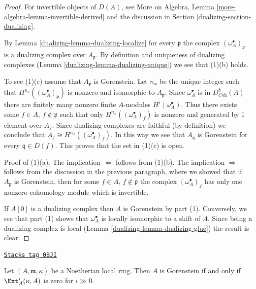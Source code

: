 \begin{proof}

For invertible objects of $D(A)$, see
More on Algebra, Lemma \ref{more-algebra-lemma-invertible-derived}
and the discussion in Section \ref{dualizing-section-dualizing}.

\medskip\noindent
By Lemma \ref{dualizing-lemma-dualizing-localize} for every
$\mathfrak p$ the complex $(\omega_A^\bullet)_\mathfrak p$ is a
dualizing complex over $A_\mathfrak p$. By definition and uniqueness
of dualizing complexes (Lemma \ref{dualizing-lemma-dualizing-unique})
we see that (1)(b) holds.

\medskip\noindent
To see (1)(c) assume that $A_\mathfrak p$ is Gorenstein.
Let $n_x$ be the unique integer such that
$H^{n_{x}}((\omega_A^\bullet)_\mathfrak p)$
is nonzero and isomorphic to $A_\mathfrak p$.
Since $\omega_A^\bullet$ is in $D^b_{\textit{Coh}}(A)$
there are finitely many nonzero finite $A$-modules
$H^i(\omega_A^\bullet)$. Thus there exists some
$f \in A$, $f \not \in \mathfrak p$
such that only $H^{n_x}((\omega_A^\bullet)_f)$
is nonzero and generated by $1$ element over $A_f$.
Since dualizing complexes are faithful (by definition)
we conclude that $A_f \cong H^{n_x}((\omega_A^\bullet)_f)$.
In this way we see that $A_\mathfrak q$ is Gorenstein
for every $\mathfrak q \in D(f)$. This proves that the set
in (1)(c) is open.

\medskip\noindent
Proof of (1)(a). The implication $\Leftarrow$ follows from (1)(b).
The implication $\Rightarrow$ follows from the discussion
in the previous paragraph, where we showed that if $A_\mathfrak p$
is Gorenstein, then for some $f \in A$, $f \not \in \mathfrak p$
the complex $(\omega_A^\bullet)_f$ has only one nonzero cohomology module
which is invertible.

\medskip\noindent
If $A[0]$ is a dualizing complex then $A$ is Gorenstein by
part (1). Conversely, we see that part (1) shows that
$\omega_A^\bullet$ is locally isomorphic to a shift of $A$.
Since being a dualizing complex is local
(Lemma \ref{dualizing-lemma-dualizing-glue})
the result is clear.
\end{proof}

\begin{lemma}
\label{dualizing-lemma-gorenstein-ext}
\href{https://stacks.math.columbia.edu/tag/0BJI}{\texttt{Stacks tag 0BJI}}

Let $(A, \mathfrak m, \kappa)$ be a Noetherian local ring.
Then $A$ is Gorenstein if and only if $\Ext^i_A(\kappa, A)$
is zero for $i \gg 0$.
\end{lemma}


